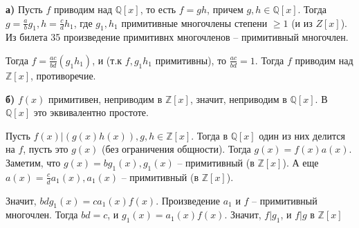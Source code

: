 \textbf{а)}
\Proof
Пусть $f$ приводим над $\mathbb{Q}[x]$, то есть $f = gh$, причем $g, h \in \mathbb{Q}[x]$. Тогда $g = \frac{a}{b}g_1, h = \frac{c}{d}h_1$, где $g_1, h_1$ примитивные многочлены степени $\geq 1$ (и из $Z[x]$). Из билета 35 произведение примитивнх многочленов -- примитивный многочлен.

Тогда $f = \frac{ac}{bd}(g_1h_1)$, и (т.к $f, g_1h_1$ примитивны), то $\frac{ac}{bd} = 1$. Тогда $f$ приводим над $\mathbb{Z}[x]$, противоречие.
\EndProof

\textbf{б)}
\Proof
$f(x)$ примитивен, неприводим в $\mathbb{Z}[x]$, значит, неприводим в $\mathbb{Q}[x]$. В $\mathbb{Q}[x]$ это эквивалентно простоте. 

Пусть $f(x)|(g(x)h(x)), g, h \in \mathbb{Z}[x]$. Тогда в $\mathbb{Q}[x]$ один из них делится на $f$, пусть это $g(x)$ (без ограничения общности). Тогда $g(x) = f(x)a(x)$. Заметим, что $g(x) = bg_1(x), g_1(x)$ -- примитивный (в $\mathbb{Z}[x]$). А еще $a(x) = \frac{c}{d}a_1(x), a_1(x)$ -- примитивный (в $\mathbb{Z}[x]$).

Значит, $bdg_1(x) = ca_1(x)f(x)$. Произведение $a_1$ и $f$ -- примитивный многочлен. Тогда $bd = c$, и $g_1(x) = a_1(x)f(x)$. Значит, $f|g_1$, и $f|g$ в $\mathbb{Z}[x]$
\EndProof